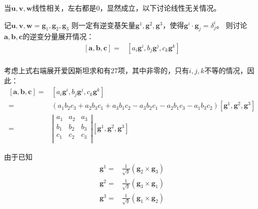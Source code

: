 \documentclass[UTF8,zihao=5]{ctexart}
\newcommand{\bm}[1]{{\mathbf{#1}}}
\begin{document}
当$\bm{u},\bm{v},\bm{w}$线性相关，左右都是0，显然成立，以下讨论线性无关情况。

记$\bm{u},\bm{v},\bm{w}=\bm{g}_1, \bm{g}_2, \bm{g}_3$
则一定有逆变基矢量$\bm{g}^1, \bm{g}^2, \bm{g}^3$，使得$\bm{g}^i\cdot\bm{g}_j=\delta^i_j$。
则讨论$\bm{a},\bm{b},\bm{c}$的逆变分量展开情况：
\begin{equation*}
    \begin{aligned}
        [\bm{a},\bm{b},\bm{c}]
        =&[a_i\bm{g}^i,b_j\bm{g}^j,c_k\bm{g}^k]\\
    \end{aligned}
\end{equation*}

考虑上式右端展开爱因斯坦求和有27项，其中非零的，只有$i,j,k$不等的情况，因此：
\begin{equation*}
    \begin{aligned}
        [\bm{a},\bm{b},\bm{c}]
        =&[a_i\bm{g}^i,b_j\bm{g}^j,c_k\bm{g}^k]\\
        =&(
            a_1b_2c_3 + a_2b_3c_1 + a_3b_1c_2
            -a_3b_2c_1 - a_2b_1c_3 - a_1b_3c_2
        )
        [\bm{g}^1, \bm{g}^2, \bm{g}^3]\\
        =&\left|
            \begin{matrix}
                a_1 &a_2 &a_3\\
                b_1 &b_2 &b_3\\
                c_1 &c_2 &c_3\\
            \end{matrix}
        \right|[\bm{g}^1, \bm{g}^2, \bm{g}^3]
    \end{aligned}
\end{equation*}

由于已知
\begin{equation*}
    \begin{aligned}
        \bm{g}^1=&
        \frac{1}{\sqrt{g}}(\bm{g}_2\times\bm{g}_3)\\
        \bm{g}^2=&
        \frac{1}{\sqrt{g}}(\bm{g}_3\times\bm{g}_1)\\
        \bm{g}^3=&
        \frac{1}{\sqrt{g}}(\bm{g}_1\times\bm{g}_2)\\
    \end{aligned}
\end{equation*}
\end{document}
